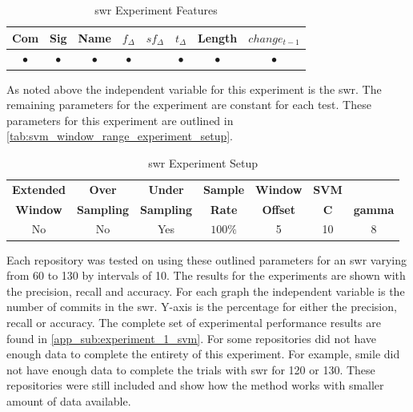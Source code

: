 \begin{table}[h]
\begin{center}

    \begin{tabular}{|c|c|c|c|c|c|c|c|}
        \hline
        Com & Sig & Name & $f_{\Delta}$ & $sf_{\Delta}$ & $t_\Delta$ & Length & $change_{t-1}$ \\
        \hline
        $\bullet$ & $\bullet$ & $\bullet$ & $\bullet$ & & $\bullet$ & $\bullet$ & $\bullet$ \\ \hline
    \end{tabular}
    \caption{\gls{swr} Experiment Features}
    \label{tab:svm_window_range_experiment_features}
\end{center}
\end{table}

As noted above the independent variable for this experiment is the \gls{swr}. The remaining parameters for the experiment are constant for each test. These parameters for this experiment are outlined in \autoref{tab:svm_window_range_experiment_setup}.

\begin{table}[h]
\begin{center}

    \begin{tabular}{|c|c|c|c|c|cc|}
        \hline
        \textbf{Extended} & \textbf{Over} & \textbf{Under} & \textbf{Sample} & \textbf{Window} & \textbf{SVM} & \\
        \textbf{Window} & \textbf{Sampling} & \textbf{Sampling} & \textbf{Rate} & \textbf{Offset} & \textbf{C} & \textbf{gamma} \\ \hline
        No & No & Yes & $100\%$ & 5 & 10 & 8 \\ \hline
    \end{tabular}
    \caption{\gls{swr} Experiment Setup}
    \label{tab:svm_window_range_experiment_setup}
\end{center}

\end{table}

Each repository was tested on using these outlined parameters for an \gls{swr} varying from 60 to 130 by intervals of 10. The results for the experiments are shown with the precision, recall and accuracy. For each graph the independent variable is the number of commits in the \gls{swr}. Y-axis is the percentage for either the precision, recall or accuracy. The complete set of experimental performance results are found in \autoref{app_sub:experiment_1_svm}. For some repositories did not have enough data to complete the entirety of this experiment. For example, smile did not have enough data to complete the trials with \gls{swr} for 120 or 130. These repositories were still included and show how the method works with smaller amount of data available.

